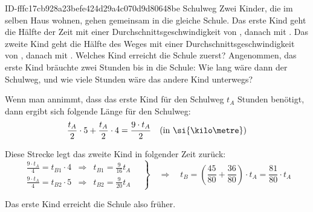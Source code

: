 \begin{exercise}
      {ID-fffc17cb928a23befe424d29a4c070d9d80648be}
      {Schulweg}
  \ifproblem\problem
    Zwei Kinder, die im selben Haus wohnen, gehen gemeinsam in die gleiche
    Schule. Das erste Kind geht die Hälfte der Zeit mit einer
    Durchschnittsgeschwindigkeit von , danach mit . Das
    zweite Kind geht die Hälfte des Weges mit einer Durchschnittsgeschwindigkeit
    von , danach mit . Welches Kind erreicht die Schule
    zuerst?
  \fi
  \ifoutline\outline
    Angenommen, das erste Kind bräuchte zwei Stunden bis in die Schule:
    Wie lang wäre dann der Schulweg, und wie viele Stunden wäre das andere Kind unterwegs?
  \fi
  \ifoutcome\outcome
    \begin{center}
    \end{center}
    Wenn man annimmt, dass das erste Kind für den Schulweg $t_{A}$ Stunden benötigt,
    dann ergibt sich folgende Länge für den Schulweg:
    \begin{equation*}
      \frac{t_{A}}{2}\cdot5+\frac{t_{A}}{2}\cdot4
      =
      \frac{9\cdot t_{A}}{2}
      \quad\text{(in \si{\kilo\metre})}
    \end{equation*}

    Diese Strecke legt das zweite Kind in folgender Zeit zurück:
    \begin{equation*}
      \left.
      \begin{array}{lcl}
        \displaystyle\frac{9\cdot t_{A}}{4}=t_{B1}\cdot4 & \Rightarrow & t_{B1}=\displaystyle\frac{9}{16}t_{A}\\[3ex]
        \displaystyle\frac{9\cdot t_{A}}{4}=t_{B2}\cdot5 & \Rightarrow & t_{B2}=\displaystyle\frac{9}{20}t_{A}
      \end{array}
      \quad\right\}
      \quad\Rightarrow\quad
      t_{B}=\left(\frac{45}{80}+\frac{36}{80}\right)\cdot t_{A}=\frac{81}{80}\cdot t_{A}
    \end{equation*}

    Das erste Kind erreicht die Schule also früher.
  \fi
\end{exercise}
